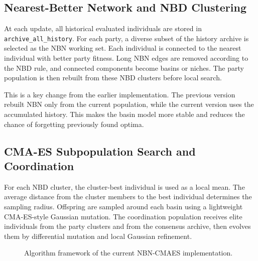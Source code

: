\documentclass[12pt,a4paper]{article}
\newcommand{\code}[1]{\texttt{#1}}
\begin{document}
\subsection{Nearest-Better Network and NBD Clustering}

At each update, all historical evaluated individuals are stored in \code{archive\_all\_history}.
For each party, a diverse subset of the history archive is selected as the NBN working set.
Each individual is connected to the nearest individual with better party fitness. Long NBN
edges are removed according to the NBD rule, and connected components become basins or
niches. The party population is then rebuilt from these NBD clusters before local search.

This is a key change from the earlier implementation. The previous version rebuilt NBN
only from the current population, while the current version uses the accumulated history.
This makes the basin model more stable and reduces the chance of forgetting previously
found optima.

\subsection{CMA-ES Subpopulation Search and Coordination}

For each NBD cluster, the cluster-best individual is used as a local mean. The average
distance from the cluster members to the best individual determines the sampling radius.
Offspring are sampled around each basin using a lightweight CMA-ES-style Gaussian
mutation. The coordination population receives elite individuals from the party clusters
and from the consensus archive, then evolves them by differential mutation and local
Gaussian refinement.

\begin{figure}[H]
\centering
{}
\caption{Algorithm framework of the current NBN-CMAES implementation.}
\label{fig:algorithm-framework}
\end{figure}
\end{document}

